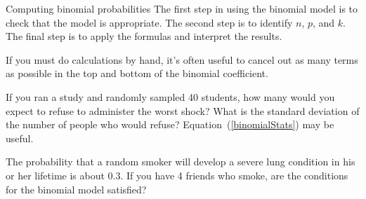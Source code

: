 \begin{onebox}{Computing binomial probabilities}
  The first step in using the binomial model is to check
  that the model is appropriate.
  The second step is to identify $n$, $p$, and $k$.
  The final step is to apply the formulas and interpret
  the results.\vspace{3mm}

  If you must do calculations by hand, it's often useful
  to cancel out as many terms as possible in the top and
  bottom of the binomial coefficient.
\end{onebox}

\begin{exercisewrap}
\begin{nexercise}
If you ran a study and randomly sampled 40 students, how many would you expect to refuse to administer the worst shock? What is the standard deviation of the number of people who would refuse? Equation~(\ref{binomialStats}) may be useful.\footnotemark
\end{nexercise}
\end{exercisewrap}

\begin{exercisewrap}
\begin{nexercise}
The probability that a random smoker will develop a severe lung condition in his or her lifetime is about $0.3$. If you have 4 friends who smoke, are the conditions for the binomial model satisfied?\footnotemark
\end{nexercise}
\end{exercisewrap}

